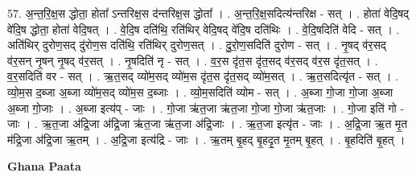 \documentclass[17pt]{extarticle}
\begin{document}
57. अ॒न्त॒रि॒क्ष॒स द्धोता॒ होता᳚ ऽन्तरिक्ष॒स द॑न्तरिक्ष॒स द्धोता᳚ । . अ॒न्त॒रि॒क्ष॒सदित्य॑न्तरिक्ष - सत् । . होता॑ वेदि॒षद् वे॑दि॒ष द्धोता॒ होता॑ वेदि॒षत् । . वे॒दि॒ष दति॑थि॒ रति॑थिर् वेदि॒षद् वे॑दि॒ष दति॑थिः । . वे॒दि॒षदिति॑ वेदि - सत् । . अति॑थिर् दुरोण॒सद् दु॑रोण॒स दति॑थि॒ रति॑थिर् दुरोण॒सत् । . दु॒रो॒ण॒सदिति॑ दुरोण - सत् । . नृ॒षद् व॑र॒सद् व॑र॒सन् नृ॒षन् नृ॒षद् व॑र॒सत् । . नृ॒षदिति॑ नृ - सत् । . व॒र॒स दृ॑त॒स दृ॑त॒सद् व॑र॒सद् व॑र॒स दृ॑त॒सत् । . व॒र॒सदिति॑ वर - सत् । . ऋ॒त॒सद् व्यो॑म॒सद् व्यो॑म॒स दृ॑त॒स दृ॑त॒सद् व्यो॑म॒सत् । . ऋ॒त॒सदित्यृ॑त - सत् । . व्यो॒म॒स द॒ब्जा अ॒ब्जा व्यो॑म॒सद् व्यो॑म॒स द॒ब्जाः । . व्यो॒म॒सदिति॑ व्योम - सत् । . अ॒ब्जा गो॒जा गो॒जा अ॒ब्जा अ॒ब्जा गो॒जाः । . अ॒ब्जा इत्य॑प् - जाः । . गो॒जा ऋ॑त॒जा ऋ॑त॒जा गो॒जा गो॒जा ऋ॑त॒जाः । . गो॒जा इति॑ गो - जाः । . ऋ॒त॒जा अ॑द्रि॒जा अ॑द्रि॒जा ऋ॑त॒जा ऋ॑त॒जा अ॑द्रि॒जाः । . ऋ॒त॒जा इत्यृ॑त - जाः । . अ॒द्रि॒जा ऋ॒त मृ॒त म॑द्रि॒जा अ॑द्रि॒जा ऋ॒तम् । . अ॒द्रि॒जा इत्य॑द्रि - जाः । . ऋ॒तम् बृ॒हद् बृ॒हदृ॒त मृ॒तम् बृ॒हत् । . बृ॒हदिति॑ बृ॒हत् । \newline

\textbf{Ghana Paata } \newline
\end{document}
